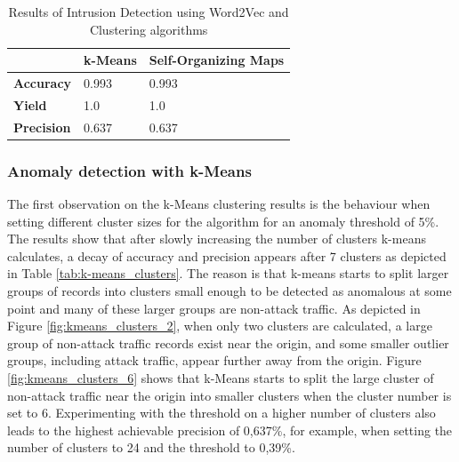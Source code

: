 \documentclass[
    fontsize=12pt,
    headings=small,
    parskip=half,           %
    bibliography=totoc,
    numbers=noenddot,       %
    open=any,               %
    ]{scrreprt}
\begin{document}
\begin{table}[H]
	\caption{Results of Intrusion Detection using Word2Vec and Clustering algorithms}
	\label{tab:results}
	\begin{tabular}{|l|l|l|}
	\hline
					   & \textbf{k-Means} & \textbf{Self-Organizing Maps} \\ \hline
	\textbf{Accuracy}  & 0.993            & 0.993                         \\ \hline
	\textbf{Yield}     & 1.0              & 1.0                           \\ \hline
	\textbf{Precision} & 0.637            & 0.637                         \\ \hline
	\end{tabular}
\end{table}

\subsubsection{Anomaly detection with k-Means}
\label{subsubsec:anom_k_means}
The first observation on the k-Means clustering results is the behaviour when setting different cluster sizes for the algorithm for an anomaly threshold of 5\%. The results show that after slowly increasing the number of clusters k-means calculates, a decay of accuracy and precision appears after 7 clusters as depicted in Table \ref{tab:k-means_clusters}. The reason is that k-means starts to split larger groups of records into clusters small enough to be detected as anomalous at some point and many of these larger groups are non-attack traffic. As depicted in Figure \ref{fig:kmeans_clusters_2}, when only two clusters are calculated, a large group of non-attack traffic records exist near the origin, and some smaller outlier groups, including attack traffic, appear further away from the origin. Figure \ref{fig:kmeans_clusters_6} shows that k-Means starts to split the large cluster of non-attack traffic near the origin into smaller clusters when the cluster number is set to 6. Experimenting with the threshold on a higher number of clusters also leads to the highest achievable precision of 0,637\%, for example, when setting the number of clusters to 24 and the threshold to 0,39\%.
\end{document}
